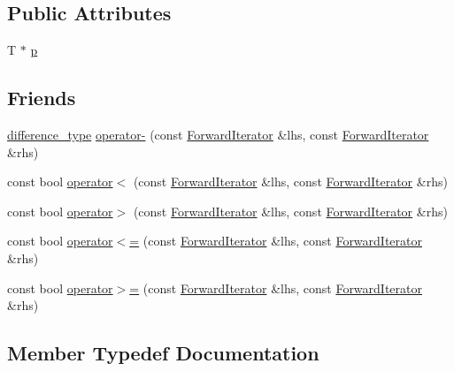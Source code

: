 \subsection*{Public Attributes}
\begin{DoxyCompactItemize}
\item 
T $\ast$ \hyperlink{classprism_1_1_forward_iterator_a44e23472687df2dcf68780ba6173557a}{p}
\end{DoxyCompactItemize}
\subsection*{Friends}
\begin{DoxyCompactItemize}
\item 
\hyperlink{classprism_1_1_forward_iterator_a8c90486e85c02351c2e957ba3247ab10}{difference\+\_\+type} \hyperlink{classprism_1_1_forward_iterator_aaad8cb3873bc75101e6aec86fda597b0}{operator-\/} (const \hyperlink{classprism_1_1_forward_iterator}{Forward\+Iterator} \&lhs, const \hyperlink{classprism_1_1_forward_iterator}{Forward\+Iterator} \&rhs)
\item 
const bool \hyperlink{classprism_1_1_forward_iterator_a6b30659c53f42b141d66d983aa919acd}{operator$<$} (const \hyperlink{classprism_1_1_forward_iterator}{Forward\+Iterator} \&lhs, const \hyperlink{classprism_1_1_forward_iterator}{Forward\+Iterator} \&rhs)
\item 
const bool \hyperlink{classprism_1_1_forward_iterator_a99354852714dd199e60ce045023c2573}{operator$>$} (const \hyperlink{classprism_1_1_forward_iterator}{Forward\+Iterator} \&lhs, const \hyperlink{classprism_1_1_forward_iterator}{Forward\+Iterator} \&rhs)
\item 
const bool \hyperlink{classprism_1_1_forward_iterator_a0587c766ccabd72167e87461c8637cc1}{operator$<$=} (const \hyperlink{classprism_1_1_forward_iterator}{Forward\+Iterator} \&lhs, const \hyperlink{classprism_1_1_forward_iterator}{Forward\+Iterator} \&rhs)
\item 
const bool \hyperlink{classprism_1_1_forward_iterator_ab9192c8005124b4eee6a698a74d71e01}{operator$>$=} (const \hyperlink{classprism_1_1_forward_iterator}{Forward\+Iterator} \&lhs, const \hyperlink{classprism_1_1_forward_iterator}{Forward\+Iterator} \&rhs)
\end{DoxyCompactItemize}


\subsection{Member Typedef Documentation}
